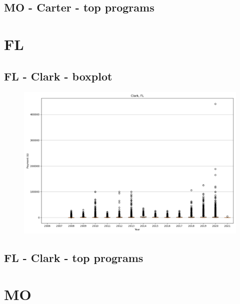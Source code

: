 \subsection*{MO - Carter - top programs}

\newpage
\section*{FL}
\subsection*{FL - Clark - boxplot}
\begin{figure}[h]
\centering
\includegraphics[width=7in]{../output/boxplots/counties/Clark-FL_boxplot.png}
\end{figure}


\subsection*{FL - Clark - top programs}

\newpage
\section*{MO}
